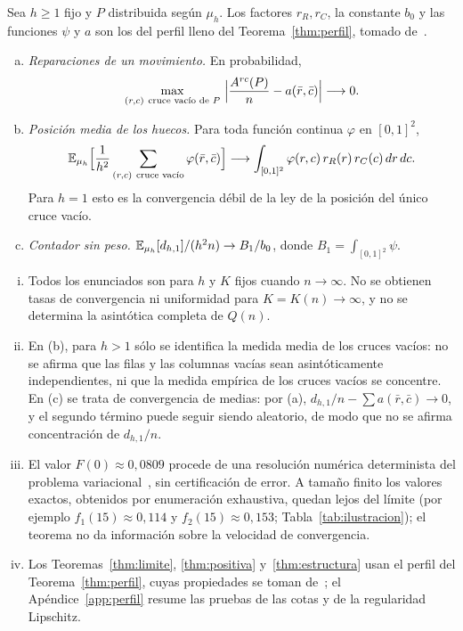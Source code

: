 \begin{teorema}\label{thm:estructura}
Sea $h\ge1$ fijo y $P$ distribuida según $\mu_h$. Los factores $r_R,r_C$, la constante $b_0$ y
las funciones $\psi$ y $a$ son los del perfil lleno del Teorema~\ref{thm:perfil}, tomado
de~\cite{Perfil}.
\begin{enumerate}[(a)]
\item \emph{Reparaciones de un movimiento.} En probabilidad,
\[
 \max_{(r,c)\ \text{cruce vacío de }P}\ \Bigl|\frac{A^{rc}(P)}{n}-a(\bar r,\bar c)\Bigr|\longrightarrow0 .
\]
\item \emph{Posición media de los huecos.} Para toda función continua $\varphi$ en $[0,1]^2$,
\[
 \E_{\mu_h}\Bigl[\frac1{h^2}\sum_{(r,c)\ \text{cruce vacío}}\varphi(\bar r,\bar c)\Bigr]
 \longrightarrow\int_{[0,1]^2}\varphi(r,c)\,r_R(r)\,r_C(c)\,dr\,dc .
\]
Para $h=1$ esto es la convergencia débil de la ley de la posición del único cruce vacío.
\item \emph{Contador sin peso.} $\mathbb{E}_{\mu_h}[d_{h,1}]/(h^2n)\to B_1/b_0$, donde
$B_1=\int_{[0,1]^2}\psi$.
\end{enumerate}
\end{teorema}

\begin{observacion}[Alcance]\label{obs:alcance}
\begin{enumerate}[(i)]
\item Todos los enunciados son para $h$ y $K$ fijos cuando $n\to\infty$. No se obtienen tasas de
convergencia ni uniformidad para $K=K(n)\to\infty$, y no se determina la asintótica completa
de $Q(n)$.
\item En (b), para $h>1$ sólo se identifica la medida media de los cruces vacíos: no se afirma
que las filas y las columnas vacías sean asintóticamente independientes, ni que la medida empírica
de los cruces vacíos se concentre. En (c) se trata de
convergencia de medias: por (a), $d_{h,1}/n-\sum a(\bar r,\bar c)\to0$, y el segundo término
puede seguir siendo aleatorio, de modo que no se afirma concentración de $d_{h,1}/n$.
\item El valor $F(0)\approx0{,}0809$ procede de una resolución numérica determinista del
problema variacional~\cite[Sección~9]{Perfil}, sin certificación de error. A tamaño finito los valores
exactos, obtenidos por
enumeración exhaustiva, quedan lejos del límite (por ejemplo $f_1(15)\approx0{,}114$ y
$f_2(15)\approx0{,}153$;
Tabla~\ref{tab:ilustracion}); el teorema no da información sobre la velocidad de convergencia.
\item Los Teoremas~\ref{thm:limite}, \ref{thm:positiva} y~\ref{thm:estructura} usan el perfil del
Teorema~\ref{thm:perfil}, cuyas propiedades se toman de~\cite{Perfil}; el
Apéndice~\ref{app:perfil} resume las pruebas de las cotas y de la regularidad Lipschitz.
\end{enumerate}
\end{observacion}

